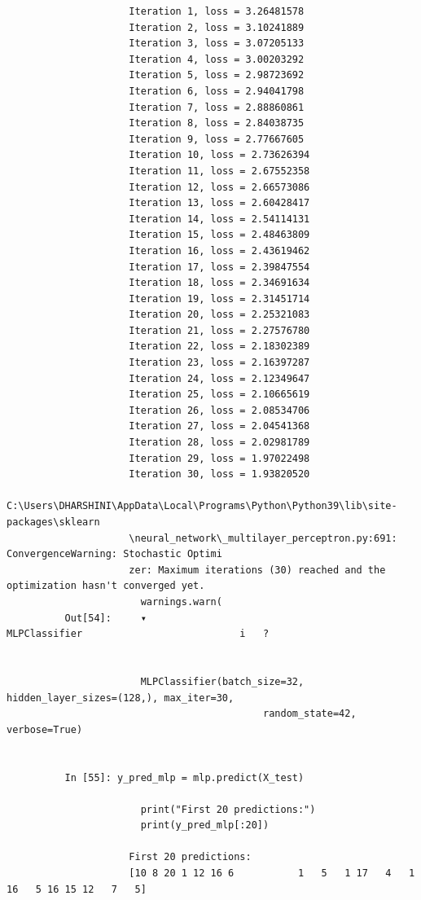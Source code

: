 \documentclass[12pt,a4paper]{article}
\begin{document}
\begin{lstlisting}
                     Iteration 1, loss = 3.26481578
                     Iteration 2, loss = 3.10241889
                     Iteration 3, loss = 3.07205133
                     Iteration 4, loss = 3.00203292
                     Iteration 5, loss = 2.98723692
                     Iteration 6, loss = 2.94041798
                     Iteration 7, loss = 2.88860861
                     Iteration 8, loss = 2.84038735
                     Iteration 9, loss = 2.77667605
                     Iteration 10, loss = 2.73626394
                     Iteration 11, loss = 2.67552358
                     Iteration 12, loss = 2.66573086
                     Iteration 13, loss = 2.60428417
                     Iteration 14, loss = 2.54114131
                     Iteration 15, loss = 2.48463809
                     Iteration 16, loss = 2.43619462
                     Iteration 17, loss = 2.39847554
                     Iteration 18, loss = 2.34691634
                     Iteration 19, loss = 2.31451714
                     Iteration 20, loss = 2.25321083
                     Iteration 21, loss = 2.27576780
                     Iteration 22, loss = 2.18302389
                     Iteration 23, loss = 2.16397287
                     Iteration 24, loss = 2.12349647
                     Iteration 25, loss = 2.10665619
                     Iteration 26, loss = 2.08534706
                     Iteration 27, loss = 2.04541368
                     Iteration 28, loss = 2.02981789
                     Iteration 29, loss = 1.97022498
                     Iteration 30, loss = 1.93820520
                     C:\Users\DHARSHINI\AppData\Local\Programs\Python\Python39\lib\site-packages\sklearn
                     \neural_network\_multilayer_perceptron.py:691: ConvergenceWarning: Stochastic Optimi
                     zer: Maximum iterations (30) reached and the optimization hasn't converged yet.
                       warnings.warn(
          Out[54]:     ▾                                  MLPClassifier                           i   ?


                       MLPClassifier(batch_size=32, hidden_layer_sizes=(128,), max_iter=30,
                                            random_state=42, verbose=True)


          In [55]: y_pred_mlp = mlp.predict(X_test)

                       print("First 20 predictions:")
                       print(y_pred_mlp[:20])

                     First 20 predictions:
                     [10 8 20 1 12 16 6           1   5   1 17   4   1 16   5 16 15 12   7   5]


\end{lstlisting}
\end{document}
